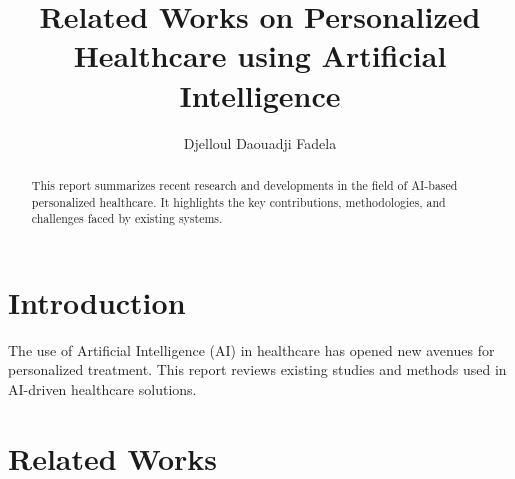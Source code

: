\documentclass[10pt,a4paper]{article}
\title{Related Works on Personalized Healthcare using Artificial Intelligence}
\author{Djelloul Daouadji Fadela}
\begin{document}
\maketitle

\begin{abstract}
This report summarizes recent research and developments in the field of AI-based personalized healthcare. It highlights the key contributions, methodologies, and challenges faced by existing systems.
\end{abstract}

\section{Introduction}
The use of Artificial Intelligence (AI) in healthcare has opened new avenues for personalized treatment. This report reviews existing studies and methods used in AI-driven healthcare solutions.

\section{Related Works}



% 
% 

\end{document}
